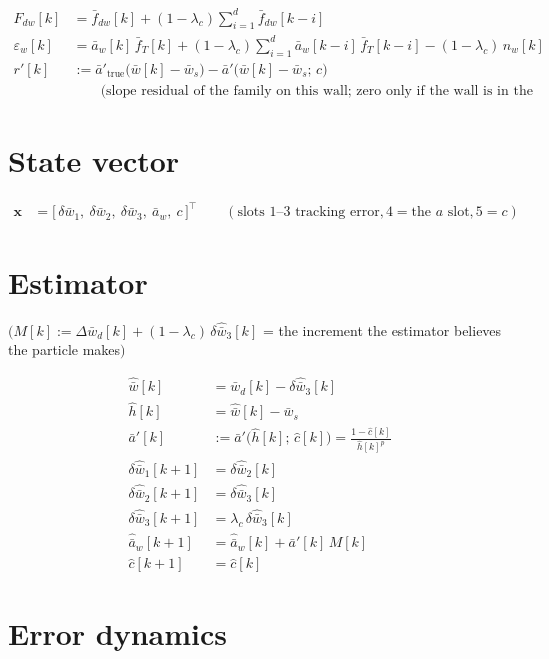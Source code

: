\documentclass[11pt,a4paper,fontset=none]{ctexart}
\newcommand{\ba}{\bar{a}}
\newcommand{\bw}{\bar{w}}
\newcommand{\ap}{\ba'}
\newcommand{\ah}{\hat{\ba}_w}
\newcommand{\wh}{\hat{\bw}}
\newcommand{\hh}{\hat{h}}
\newcommand{\ch}{\hat{c}}
\begin{document}
\begin{align*}
F_{dw}[k]        &= \bar f_{dw}[k] + (1-\lambda_c)\sum_{i=1}^{d}\bar f_{dw}[k-i] \\
\varepsilon_w[k] &= \ba_w[k]\,\bar f_T[k] + (1-\lambda_c)\sum_{i=1}^{d}\ba_w[k-i]\,\bar f_T[k-i] - (1-\lambda_c)\,n_w[k] \\
r'[k]            &:= \ap_{\mathrm{true}}\bigl(\bw[k] - \bw_s\bigr) - \ap\bigl(\bw[k] - \bw_s;\,c\bigr) \\
                 &\qquad\text{(slope residual of the family on this wall; zero only if the wall is in the family)}
\end{align*}

\section{State vector}

\begin{align*}
\mathbf{x} &= \bigl[\,\delta\bw_1,\ \delta\bw_2,\ \delta\bw_3,\ \ba_w,\ c\,\bigr]^{\top}
\qquad (\text{slots } 1\text{--}3 \text{ tracking error}, 4 = \text{the } a \text{ slot}, 5 = c)
\end{align*}

\section{Estimator}

$\bigl(M[k] := \Delta\bw_d[k] + (1-\lambda_c)\,\delta\hat{\bw}_3[k]$ = the increment the estimator believes the particle makes$\bigr)$

\begin{align*}
\wh[k]                 &= \bw_d[k] - \delta\hat{\bw}_3[k] \\
\hh[k]                 &= \wh[k] - \bw_s \\
\ap[k]                 &:= \ap\bigl(\hh[k];\,\ch[k]\bigr) = \frac{1 - \ch[k]}{\hh[k]^{p}} \\
\delta\hat{\bw}_1[k+1] &= \delta\hat{\bw}_2[k] \\
\delta\hat{\bw}_2[k+1] &= \delta\hat{\bw}_3[k] \\
\delta\hat{\bw}_3[k+1] &= \lambda_c\,\delta\hat{\bw}_3[k] \\
\ah[k+1]               &= \ah[k] + \ap[k]\,M[k] \\
\ch[k+1]               &= \ch[k]
\end{align*}

\section{Error dynamics}
\end{document}

